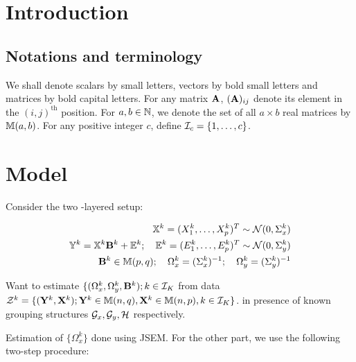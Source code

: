 \documentclass[12pt, letterpaper]{article}
\numberwithin{equation}{section}
\begin{document}
\newpage

\section{Introduction}

\subsection{Notations and terminology}
We shall denote scalars by small letters, vectors by bold small letters and matrices by bold capital letters. For any matrix ${\mathbf{A}}$, $({\mathbf{A}})_{ij}$ denote its element in the $(i,j)^\text{th}$ position. For $a,b \in {\mathbb{N}}$, we denote the set of all $a \times b$ real matrices by ${\mathbb{M}}(a,b)$. For any positive integer $c$, define ${\cal{I}}_c = \{ 1, \ldots, c\}$.

\section{Model}
Consider the two -layered setup:

\begin{eqnarray}
{\mathbb{X}}^k = (X^k_1, \ldots, X^k_p)^T \sim {\cal{N}} (0, \Sigma^k_x)\\
{\mathbb{Y}}^k = {\mathbb{X}}^k {\mathbf{B}}^k + {\mathbb{E}}^k; \quad {\mathbb{E}}^k = (E^k_1, \ldots, E^k_p)^T \sim {\cal{N}} (0, \Sigma^k_y)\\
{\mathbf{B}}^k \in {\mathbb{M}}(p,q); \quad \Omega^k_x = (\Sigma^k_x)^{-1}; \quad \Omega^k_y = (\Sigma^k_y)^{-1}
\end{eqnarray}

Want to estimate $\{ (\Omega^k_x, \Omega^k_y, {\mathbf{B}}^k); k \in {\cal{I}}_K$ from data ${\cal{Z}}^k = \{ ({\mathbf{Y}}^k, {\mathbf{X}}^k); {\mathbf{Y}}^k \in {\mathbb{M}}(n,q), {\mathbf{X}}^k \in {\mathbb{M}}(n,p), k \in {\cal{I}}_K\}$. in presence of known grouping structures ${\cal{G}}_x, {\cal{G}}_y, {\cal{H}}$ respectively. 


Estimation of $\{ \Omega_x^k \}$ done using JSEM. For the other part, we use the following two-step procedure:
\end{document}
